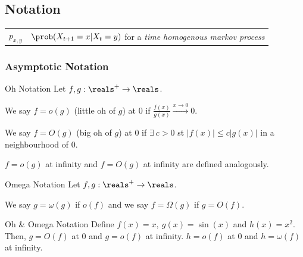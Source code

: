 \documentclass[11pt,a4paper]{article}
\begin{document}
\subsection{Notation}
\begin{tabular}{|c|c|}
  $p_{x,y}$&$\prob(X_{t+1}=x|X_{t}=y)$ for a \textit{time homogenous markov process}\\
\end{tabular}

\subsubsection{Asymptotic Notation}

\begin{definition}{Oh Notation}
  Let $f,g:\reals^+\to\reals$.
  \par We say $f=o(g)$ (little oh of $g$) at 0 if $\frac{f(x)}{g(x)}\overset{x\to0}\longrightarrow0$.
  \par We say $f=O(g)$ (big oh of $g$) at 0 if $\exists\ c>0$ st $|f(x)|\leq c|g(x)|$ in a neighbourhood of 0.
  \par $f=o(g)$ at infinity and $f=O(g)$ at infinity are defined analogously.
\end{definition}

\begin{definition}{Omega Notation}
  Let $f,g:\reals^+\to\reals$.
  \par We say $g=\omega(g)$ if $o(f)$ and we say $f=\Omega(g)$ if $g=O(f)$.
\end{definition}

\begin{example}{Oh \& Omega Notation}
  Define $f(x)=x,\ g(x)=\sin(x)$ and $h(x)=x^2$.\\
  Then, $g=O(f)$ at 0 and $g=o(f)$ at infinity. $h=o(f)$ at 0 and $h=\omega(f)$ at infinity.
\end{example}
\end{document}
